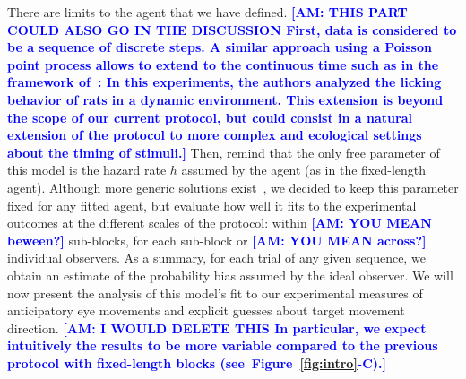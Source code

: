 \documentclass[12pt,english]{article}%
\newcommand{\citep}[1]{\parencite{#1}}
\newcommand{\citet}[1]{\textcite{#1}}
\newcommand{\seeFig}[1]{Figure~\ref{fig:#1}}
\newcommand{\AM}[1]{\textbf{\textcolor{blue}{[AM: #1]}}}
\begin{document}
There are limits to the agent that we have defined.
\AM{THIS PART COULD ALSO GO IN THE DISCUSSION First, data is considered to be a sequence of discrete steps.
A similar approach using a Poisson point process 
allows to extend to the continuous time
such as in the framework of~\citet{RadilloBrady2017}:
In this experiments, the authors analyzed the licking behavior of rats in a dynamic environment.
This extension is beyond the scope of our current protocol,
but could consist in a natural extension of the protocol
to more complex and ecological settings about the timing of stimuli.}
Then, remind that the only free parameter of this model is the hazard rate $h$
assumed by the agent (as in the fixed-length agent).
Although more generic solutions exist~\citep{Wilson13,Wilson18},
we decided to keep this parameter fixed for any fitted agent, but evaluate
how well it fits to the experimental outcomes at the different scales of the protocol:
within \AM{YOU MEAN beween?} sub-blocks, for each sub-block or \AM{YOU MEAN across?} individual observers.
As a summary, for each trial of any given sequence,
we obtain an estimate of the probability bias assumed by the ideal observer. We will now present the analysis of this model's fit to our experimental measures of anticipatory eye movements and explicit guesses about target movement direction.
\AM{I WOULD DELETE THIS In particular, we expect intuitively the results to be more variable
compared to the previous protocol with fixed-length blocks (see~\seeFig{intro}-C).}
\end{document}
